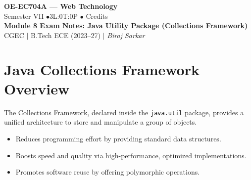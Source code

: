 \documentclass[12pt,a4paper]{article}
\begin{document}

\begin{center}
  {\LARGE\bfseries\color{myred} OE-EC704A --- Web Technology}\\[5pt]
  {\normalsize\color{mydark} Semester VII \quad$\bullet$\quad 3L:0T:0P \quad$\bullet$ Credits}\\[3pt]
  {\normalsize\color{myteal}\textbf{Module 8 Exam Notes: Java Utility Package (Collections Framework)}}\\[3pt]
  {\small\color{mydark} CGEC \;$|$\; B.Tech ECE (2023--27) \;$|$\; \textit{Biraj Sarkar}}
\end{center}
\noindent{\color{myred}\rule{\linewidth}{1.5pt}}
\vspace{2pt}

\hypersetup{linkcolor=mydark}
\tableofcontents
\hypersetup{linkcolor=myteal}
\newpage

\section{Java Collections Framework Overview}

The Collections Framework, declared inside the \texttt{java.util} package, provides a unified architecture to store and manipulate a group of objects.

\begin{tcolorbox}[defbox, title={\textbf{Core Design Benefits}}]
\begin{itemize}[leftmargin=*, itemsep=3pt]
  \item Reduces programming effort by providing standard data structures.
  \item Boosts speed and quality via high-performance, optimized implementations.
  \item Promotes software reuse by offering polymorphic operations.
\end{itemize}
\end{tcolorbox}
\end{document}
